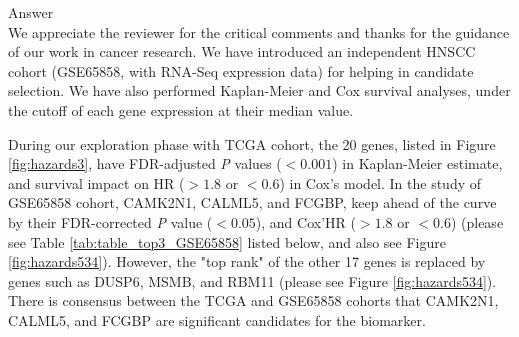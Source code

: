 \documentclass[preprint,12pt]{elsarticle}
\newenvironment{MyColorPar}[1]{%
    \leavevmode\color{#1}\ignorespaces%
}{%
}%
\begin{document}
%
\begin{MyColorPar}{blue}
Answer\\


We appreciate the reviewer for the critical comments and thanks for the guidance of our work in cancer research.
We have introduced an independent HNSCC cohort (GSE65858, with RNA-Seq expression data) for helping in candidate selection.
We have also performed Kaplan-Meier and Cox survival analyses, under the cutoff of each gene expression at their median value.

During our exploration phase with TCGA cohort, the 20 genes, listed
in Figure \ref{fig:hazards3}, have FDR-adjusted \textit{P} values ($<0.001$) in Kaplan-Meier estimate, and survival impact on HR ($> 1.8$ or $< 0.6$) in Cox's model.
%
In the study of GSE65858 cohort, CAMK2N1, CALML5, and FCGBP, keep ahead of the curve by their FDR-corrected \textit{P} value ($< 0.05$), and Cox'HR ($>1.8$ or $<0.6$) (please see Table \ref{tab:table_top3_GSE65858} listed below,
and also see Figure \ref{fig:hazards534}).
However, the "top rank" of the other 17 genes is replaced by genes such as DUSP6, MSMB, and RBM11 (please see Figure \ref{fig:hazards534}).
There is consensus between the TCGA and GSE65858 cohorts that CAMK2N1, CALML5, and FCGBP are significant candidates for the biomarker.


\end{MyColorPar}
\end{document}
